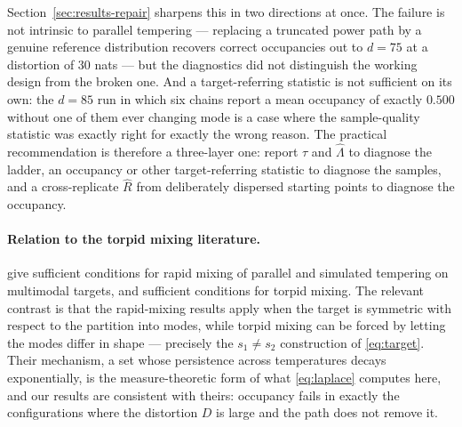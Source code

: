 Section~\ref{sec:results-repair} sharpens this in two directions at once. The
failure is not intrinsic to parallel tempering --- replacing a truncated power
path by a genuine reference distribution recovers correct occupancies out to
$d=75$ at a distortion of $30$ nats --- but the diagnostics did not distinguish
the working design from the broken one. And a target-referring statistic is not
sufficient on its own: the $d=85$ run in which six chains report a mean occupancy
of exactly $0.500$ without one of them ever changing mode is a case where the
sample-quality statistic was exactly right for exactly the wrong reason. The
practical recommendation is therefore a three-layer one: report $\tau$ and
$\hat\Lambda$ to diagnose the ladder, an occupancy or other target-referring
statistic to diagnose the samples, and a cross-replicate $\hat R$ from
deliberately dispersed starting points to diagnose the occupancy.

\paragraph{Relation to the torpid mixing literature.}
\citet{woodard2009rapid} give sufficient conditions for rapid mixing of parallel
and simulated tempering on multimodal targets, and \citet{woodard2009torpid}
sufficient conditions for torpid mixing. The relevant contrast is that the
rapid-mixing results apply when the target is symmetric with respect to the
partition into modes, while torpid mixing can be forced by letting the modes
differ in shape --- precisely the $s_1\ne s_2$ construction of
\eqref{eq:target}. Their mechanism, a set whose persistence across temperatures
decays exponentially, is the measure-theoretic form of what \eqref{eq:laplace}
computes here, and our results are consistent with theirs: occupancy fails in
exactly the configurations where the distortion $D$ is large and the path does
not remove it.

